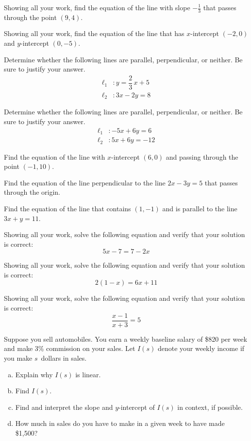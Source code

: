 \documentclass[11pt,letterpaper]{article}
\begin{document}
\prob Showing all your work, find the equation of the line with slope $-\frac{1}{3}$ that passes through the point $(9, 4)$. \pspace


\prob Showing all your work, find the equation of the line that has $x$-intercept $(-2, 0)$ and $y$-intercept $(0, -5)$. \pspace


\prob Determine whether the following lines are parallel, perpendicular, or neither. Be sure to justify your answer. \pvspace{0.1cm}
	\[
	\begin{aligned}
	\ell_1 &\colon y= \dfrac{2}{3}\,x + 5 \\[0.3cm]
	\ell_2 &\colon 3x - 2y= 8
	\end{aligned}
	\] \pspace


\prob Determine whether the following lines are parallel, perpendicular, or neither. Be sure to justify your answer. \pvspace{0.1cm}
	\[
	\begin{aligned}
	\ell_1 &\colon -5x + 6y= 6 \\[0.3cm]
	\ell_2 &\colon 5x + 6y= -12
	\end{aligned}
	\] \pspace


\prob Find the equation of the line with $x$-intercept $(6, 0)$ and passing through the point $(-1, 10)$. \pspace


\prob Find the equation of the line perpendicular to the line $2x - 3y= 5$ that passes through the origin. \pspace


\prob Find the equation of the line that contains $(1, -1)$ and is parallel to the line $3x + y= 11$. \pspace


\prob Showing all your work, solve the following equation and verify that your solution is correct:
	\[
	5x - 7= 7 - 2x
	\] \pspace


\prob Showing all your work, solve the following equation and verify that your solution is correct:
	\[
	2(1 - x)= 6x + 11
	\] \pspace


\prob Showing all your work, solve the following equation and verify that your solution is correct:
	\[
	\dfrac{x - 1}{x + 3}= 5
	\] \pspace


\prob Suppose you sell automobiles. You earn a weekly baseline salary of \$820 per week and make 3\% commission on your sales. Let $I(s)$ denote your weekly income if you make $s$~dollars in sales. 
	\begin{enumerate}[(a)]
	\item Explain why $I(s)$ is linear. 
	\item Find $I(s)$.
	\item Find and interpret the slope and $y$-intercept of $I(s)$ in context, if possible. 
	\item How much in sales do you have to make in a given week to have made \$1,500?
	\end{enumerate} \pspace
\end{document}
